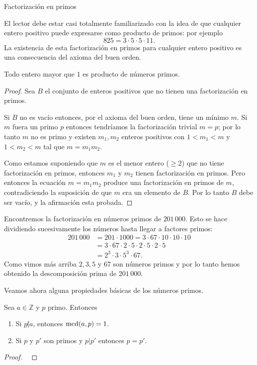 \begin{section}{Factorización en primos}
\begin{observacion}
\end{observacion} 


El lector debe estar casi totalmente familiarizado con la idea de que cualquier entero positivo puede
expresarse como producto de primos: por ejemplo
$$
825=3\cdot 5\cdot 5\cdot 11.
$$
La existencia de esta factorización en primos para cualquier entero positivo es una consecuencia del axioma del buen orden.

\begin{teorema}
Todo  entero  mayor que $1$ es producto de números primos. 
\end{teorema}                                                
\begin{proof} Sea $B$ el conjunto de enteros positivos que no tienen una factorización en primos.

Si $B$ no es vacío entonces, por el axioma del buen orden, tiene un mínimo $m$. Si $m$ fuera un primo $p$ entonces tendríamos la factorización trivial $m=p$; por lo tanto $m$ no es primo y existen $m_1,m_2$ enteros positivos con  $1<m_1<m$ y $1<m_2< m$ tal que $m=m_1m_2$.

Como estamos suponiendo que $m$ es el menor entero ($\ge 2$) que no tiene factorización en primos, entonces $m_1$ y $m_2$ tienen factorización en primos. Pero entonces la ecuación $m=m_1m_2$ produce una factorización en primos de $m$, contradiciendo la suposición de que $m$ era un elemento de $B$. Por lo tanto $B$ debe ser vacío, y la afirmación esta probada.
\end{proof}

\begin{ejemplo} 
Encontremos la factorización en números primos de $201\,000$. Esto se hace di\-vi\-dien\-do  sucesivamente los números hasta llegar a factores primos:
\begin{align*}
201\,000 &= 201\cdot 1000 = 3\cdot 67\cdot 10\cdot 10\cdot 10\\ &=  3\cdot 67\cdot 2\cdot 5 \cdot 2\cdot 5 \cdot 2\cdot 5 \\&= 2^3\cdot 3\cdot 5^3\cdot 67.
\end{align*}
Como vimos más arriba $2, 3, 5$ y $67$ son  números primos y por lo tanto hemos obtenido la descomposición prima de $201\,000$.
\end{ejemplo}


Veamos ahora alguna propiedades básicas de los números primos.

\begin{observacion} \label{pdivpp}
Sea $a \in \mathbb Z$ y $p$ primo. Entonces 
\begin{enumerate}[label=(\alph*)]
\item  Si $p{\not|}a$, entonces $\operatorname{mcd}(a,p) = 1$.
\item  Si $p$ y $p'$ son primos y $p|p'$ entonces $p=p'$.
\end{enumerate}
\end{observacion}
\begin{proof}
\


\end{proof}
\end{section}
